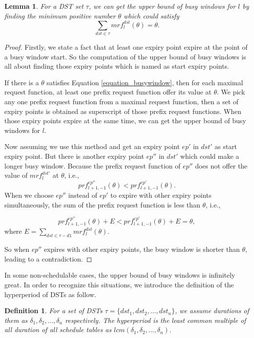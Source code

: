 \documentclass[10pt,conference]{IEEEtran}
\newtheorem{definition}{Definition}
\newtheorem{lemma}{Lemma}
\begin{document}
\begin{lemma}
For a DST set $\tau$, we can get the upper bound of busy windows for $l$ by finding the minimum positive number $\theta$ which could satisfy
\begin{equation}
\sum\limits_{dst\in \tau}mrf^{dst}_l(\theta)=\theta.\label{equation_busywindow}
\end{equation}
\end{lemma}\label{lemma_busywindow}
\begin{proof}
Firstly, we state a fact that at least one expiry point expire at the point of a busy window start. So the computation of the upper bound of busy windows is all about finding those expiry points which is named as start expiry points.

If there is a $\theta$ satisfies Equation \ref{equation_busywindow}, then for each maximal request function, at least one prefix request function offer its value at $\theta$. We pick any one prefix request function from a maximal request function, then a set of expiry points is obtained as superscript of those prefix request functions. When those expiry points expire at the same time, we can get the upper bound of busy windows for $l$.

Now assuming we use this method and get an expiry point $ep'$ in $dst'$ as start expiry point. But there is another expiry point $ep''$ in $dst'$ which could make a longer busy window. Because the prefix request function of $ep''$ does not offer the value of $mrf^{dst'}_l$ at $\theta$, i.e.,
\[prf^{ep''}_{l+1,-1}(\theta)<prf^{ep'}_{l+1,-1}(\theta).\]
When we choose $ep''$ instead of $ep'$ to expire with other expiry points simultaneously, the sum of the prefix request function is less than $\theta$, i.e., 

\begin{equation}
prf^{ep''}_{l+1,-1}(\theta)+E<prf^{ep'}_{l+1,-1}(\theta)+E=\theta, 
\end{equation}
where $E=\sum\limits_{dst\in \tau-d1}mrf^{dst}_l(\theta)$.

So when $ep''$ expires with other expiry points, the busy window is shorter than $\theta$, leading to a contradiction.
\end{proof}

In some non-schedulable cases, the upper bound of busy windows is infinitely great. In order to recognize this situations, we introduce the definition of the hyperperiod of DSTs as follow.
\begin{definition}
For a set of DSTs $\tau=\{dst_1,dst_2,\dots,dst_n\}$, we assume durations of them as $\delta_1,\delta_2,\dots,\delta_n$ respectively. The hyperperiod is the least common multiple of all duration of all schedule tables as $lcm(\delta_1,\delta_2,\dots,\delta_n)$.
\end{definition}
\end{document}
